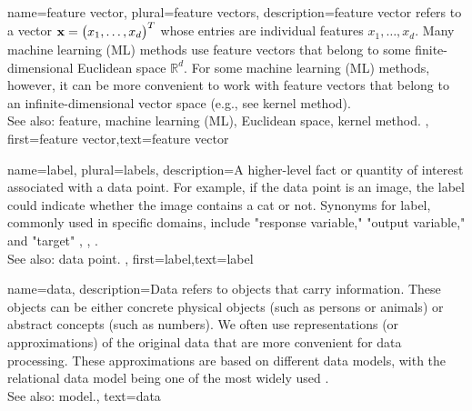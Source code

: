 {name={feature vector}, plural={feature vectors},
	description={\Gls{feature} vector refers to a vector ${\bf x} = \big(x_{1},\ldots,x_{d}\big)^{T}$ 
	whose entries are individual features $x_{1},\ldots,x_{d}$. Many machine learning (ML) methods 
	use feature vectors that belong to some finite-dimensional Euclidean space $\mathbb{R}^{d}$. 
	For some machine learning (ML) methods, however, it can be more convenient to work with feature 
	vectors that belong to an infinite-dimensional vector space (e.g., see kernel method). 
			\\
		See also: feature, machine learning (ML), Euclidean space, kernel method.
		}, first={feature vector},text={feature vector}  
}


{name={label}, plural={labels},
	description={A higher-level fact or quantity of interest associated with a data point. 
		For example, if the data point is an image, the label could indicate whether the 
		image contains a cat or not. Synonyms for label, commonly used in specific domains, 
		include "response variable," "output variable," and "target" \cite{Gujarati2021}, \cite{Dodge2003}, \cite{Everitt2022}.
				\\
		See also: data point.
 },
	first={label},text={label}  
}


{name={data},
	 description={Data refers to objects that carry information. These 
	 	objects can be either concrete physical objects (such as persons or animals) 
	 	or abstract concepts (such as numbers). We often use representations (or 
	 	approximations) of the original data that are more convenient for data processing. 
	 	These approximations are based on different data models, with the relational data 
	 	model being one of the most widely used \cite{codd1970relational}.
				\\
		See also: model.}, 
	text={data}
}

